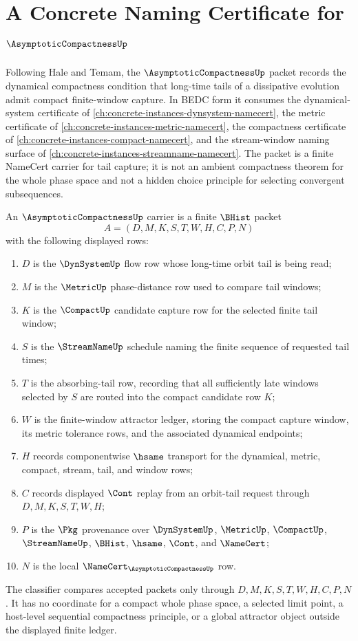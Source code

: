 \chapter{A Concrete Naming Certificate for $\AsymptoticCompactnessUp$}
\label{ch:concrete-instances-asymptotic-compactness-namecert}

Following Hale and Temam, the $\AsymptoticCompactnessUp$ packet records the dynamical compactness condition that long-time tails of a dissipative evolution admit compact finite-window capture. In BEDC form it consumes the dynamical-system certificate of \autoref{ch:concrete-instances-dynsystem-namecert}, the metric certificate of \autoref{ch:concrete-instances-metric-namecert}, the compactness certificate of \autoref{ch:concrete-instances-compact-namecert}, and the stream-window naming surface of \autoref{ch:concrete-instances-streamname-namecert}. The packet is a finite NameCert carrier for tail capture; it is not an ambient compactness theorem for the whole phase space and not a hidden choice principle for selecting convergent subsequences.

\begin{definition}
\label{def:asymptotic-compactness-packet-carrier}
An $\AsymptoticCompactnessUp$ carrier is a finite $\BHist$ packet
$$
A=(D,M,K,S,T,W,H,C,P,N)
$$
with the following displayed rows:
\begin{enumerate}
\item $D$ is the $\DynSystemUp$ flow row whose long-time orbit tail is being read;
\item $M$ is the $\MetricUp$ phase-distance row used to compare tail windows;
\item $K$ is the $\CompactUp$ candidate capture row for the selected finite tail window;
\item $S$ is the $\StreamNameUp$ schedule naming the finite sequence of requested tail times;
\item $T$ is the absorbing-tail row, recording that all sufficiently late windows selected by $S$ are routed into the compact candidate row $K$;
\item $W$ is the finite-window attractor ledger, storing the compact capture window, its metric tolerance rows, and the associated dynamical endpoints;
\item $H$ records componentwise $\hsame$ transport for the dynamical, metric, compact, stream, tail, and window rows;
\item $C$ records displayed $\Cont$ replay from an orbit-tail request through $D,M,K,S,T,W,H$;
\item $P$ is the $\Pkg$ provenance over $\DynSystemUp$, $\MetricUp$, $\CompactUp$, $\StreamNameUp$, $\BHist$, $\hsame$, $\Cont$, and $\NameCert$;
\item $N$ is the local $\NameCert_{\AsymptoticCompactnessUp}$ row.
\end{enumerate}
The classifier compares accepted packets only through $D,M,K,S,T,W,H,C,P,N$. It has no coordinate for a compact whole phase space, a selected limit point, a host-level sequential compactness principle, or a global attractor object outside the displayed finite ledger.
\end{definition}

